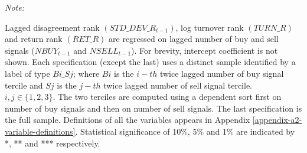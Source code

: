 \begin{landscape}
\begin{table}
\begin{threeparttable}
\begin{tabular}[t]
\bottomrule
\end{tabular}
\begin{tablenotes}
\item \textit{Note: } 
\item Lagged disagreement rank $(STD\_DEV\_R_{t-1})$, log turnover rank $(TURN\_R)$ and return rank $(RET\_R)$ are regressed on lagged number of buy and sell signals ($NBUY_{t-1}$ and $NSELL_{t-1}$). For brevity, intercept coefficient is not shown. Each specification (except the last) uses a distinct sample identified by a label of type $Bi\_Sj$; where $Bi$ is the $i-th$ twice lagged number of buy signal tercile and $Sj$ is the $j-th$ twice lagged number of sell signal tercile. $i,j \in \{1,2,3\}$. The two terciles are computed using a dependent sort first on number of buy signals and then on number of sell signals. The last specification is the full sample. Definitions of all the variables appears in Appendix \ref{appendix-a2-variable-definitions}. Statistical significance of 10\%, 5\% and 1\% are indicated by *, ** and *** respectively.
\end{tablenotes}
\end{threeparttable}


\end{table}
\end{landscape}
\restoregeometry
